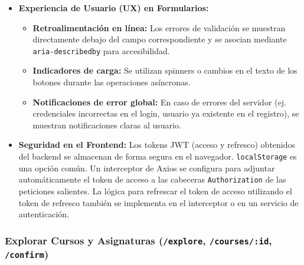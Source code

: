 \begin{itemize}[leftmargin=*]
  \item \textbf{Experiencia de Usuario (UX) en Formularios:}
        \begin{itemize}
          \item \textbf{Retroalimentación en línea:} Los errores de validación se muestran directamente debajo del campo correspondiente y se asocian mediante \texttt{aria-describedby} para accesibilidad.
          \item \textbf{Indicadores de carga:} Se utilizan spinners o cambios en el texto de los botones durante las operaciones asíncronas.
          \item \textbf{Notificaciones de error global:} En caso de errores del servidor (ej. credenciales incorrectas en el login, usuario ya existente en el registro), se muestran notificaciones claras al usuario.
        \end{itemize}

  \item \textbf{Seguridad en el Frontend:} Los tokens JWT (acceso y refresco) obtenidos del backend se almacenan de forma segura en el navegador. \texttt{localStorage} es una opción común. Un interceptor de Axios se configura para adjuntar automáticamente el token de acceso a las cabeceras \texttt{Authorization} de las peticiones salientes. La lógica para refrescar el token de acceso utilizando el token de refresco también se implementa en el interceptor o en un servicio de autenticación.
\end{itemize}

\subsubsection{Explorar Cursos y Asignaturas (\texttt{/explore}, \texttt{/courses/:id}, \texttt{/confirm})}
\label{sssec:desarrollo_explore_pages}

